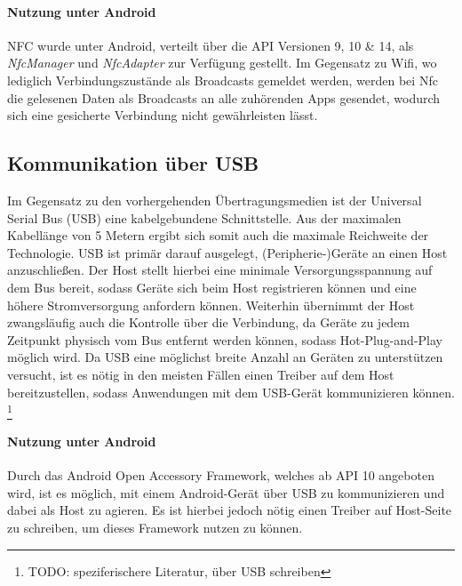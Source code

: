         \paragraph{Nutzung unter Android}
        NFC wurde unter Android, verteilt über die API Versionen 9, 10 \& 14,  als {\it NfcManager} und {\it NfcAdapter} zur Verfügung gestellt. Im Gegensatz zu Wifi, wo lediglich Verbindungszustände als Broadcasts gemeldet werden, werden bei Nfc die gelesenen Daten als Broadcasts an alle zuhörenden Apps gesendet, wodurch sich eine gesicherte Verbindung nicht gewährleisten lässt.

    \subsection{Kommunikation über USB}
        Im Gegensatz zu den vorhergehenden Übertragungsmedien ist der Universal Serial Bus (USB) eine kabelgebundene Schnittstelle. Aus der maximalen Kabellänge von 5 Metern
        ergibt sich somit auch die maximale Reichweite der Technologie. USB ist primär darauf ausgelegt, (Peripherie-)Geräte an einen Host anzuschließen.
        Der Host stellt hierbei eine minimale Versorgungsspannung auf dem Bus bereit, sodass Geräte sich beim Host registrieren können und eine höhere Stromversorgung anfordern können.
        Weiterhin übernimmt der Host zwangsläufig auch die Kontrolle über die Verbindung, da Geräte zu jedem Zeitpunkt physisch vom Bus entfernt werden können, sodass Hot-Plug-and-Play
        möglich wird. \cite[S.21-24]{Kelm}
        Da USB eine möglichst breite Anzahl an Geräten zu unterstützen versucht, ist es nötig in den meisten Fällen einen Treiber auf dem Host bereitzustellen, sodass Anwendungen mit dem USB-Gerät kommunizieren können.\cite[S.197]{Kelm}
        \footnote{TODO: speziferischere Literatur, über USB schreiben}

        \paragraph{Nutzung unter Android}
        Durch das Android Open Accessory Framework, welches ab API 10 angeboten wird, ist es möglich, mit einem Android-Gerät über USB zu kommunizieren und dabei als Host zu agieren. Es ist hierbei jedoch nötig einen Treiber auf Host-Seite zu schreiben, um dieses Framework nutzen zu können.\cite{AOA}


